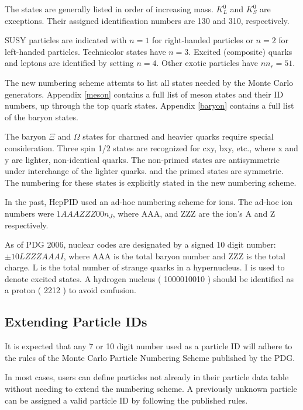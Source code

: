 The states are generally listed in order of increasing mass.  
$K_L^0$ and $K_S^0$ are exceptions.  Their assigned
identification numbers are 130 and 310, respectively.

SUSY particles are indicated with $n=1$ for right-handed particles or $n=2$
for left-handed particles.  Technicolor states have $n=3$.
Excited (composite) quarks and leptons are identified by setting $n=4$.
Other exotic particles have $n n_r=51$.

The new numbering scheme attemts to list all states needed by the
Monte Carlo generators.  Appendix \ref{meson}
contains a full list of meson states and their ID numbers, up through the
top quark states.   
Appendix \ref{baryon} contains a full list of the baryon states.

The baryon $\Xi$ and $\Omega$ states for charmed
and heavier quarks require special consideration.  
Three spin 1/2 states are recognized
for cxy, bxy, etc., where x and y are lighter, non-identical quarks.
The non-primed states are antisymmetric under interchange of the lighter quarks.
and the primed states are symmetric.  The numbering for these states is 
explicitly stated in the new numbering scheme.

In the past, HepPID used an ad-hoc numbering scheme for ions.  
The ad-hoc ion numbers were $1AAAZZZ00n_J$, where
AAA, and ZZZ are the ion's A and Z respectively.

As of PDG 2006\cite{scheme}, nuclear codes are designated by a 
signed 10 digit number: $\pm 10LZZZAAAI$, where 
AAA is the total baryon number and
ZZZ is the total charge.
L is the total number of strange quarks in a hypernucleus.  
I is used to denote excited states.
A hydrogen nucleus ( 1000010010 ) should be identified as a proton ( 2212 )
to avoid confusion.

\subsection { Extending Particle IDs }
\label{pid}

It is expected that any 7 or 10 digit number used as a particle ID will 
adhere to the rules of the Monte Carlo Particle Numbering Scheme 
published by the PDG.\cite{pdg}

In most cases, users can define particles not already in their
particle data table without needing to extend the numbering scheme.
A previously unknown particle can be assigned a valid particle ID by
following the published rules.\cite{scheme}

